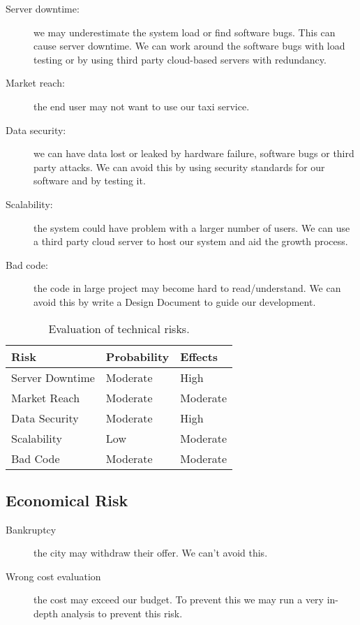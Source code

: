     \begin{description}
      \item[Server downtime:] we may underestimate the system load or find
          software bugs. This can cause server downtime. We can work around
          the software bugs with load testing or by using third party cloud-based servers with redundancy.
      \item[Market reach:] the end user may not want to use our taxi service. 
      \item[Data security:] we can have data lost or leaked by hardware failure,
          software bugs or third party attacks. We can avoid
          this by using security standards for our software and by testing it.
      \item[Scalability:] the system could have problem with a larger number of users. We can use a third party cloud server
          to host our system and aid the growth process.
      \item[Bad code:] the code in large project may become hard to read/understand. We can avoid this by
          write a Design Document to guide our development.
    \end{description}

    \begin{table}[h]
      \centering
          \begin{tabular}{| l | l | l |}
              \hline
              \textbf{Risk} & \textbf{Probability}  & \textbf{Effects}  \\
              \hline
              Server Downtime & Moderate & High\\
              \hline
              Market Reach & Moderate & Moderate\\
              \hline
              Data Security & Moderate & High\\
              \hline
              Scalability & Low & Moderate          \\
              \hline
              Bad Code & Moderate & Moderate\\
              \hline
          \end{tabular}
        \caption{Evaluation of technical risks.}
    \end{table}
	
  \subsection{Economical Risk}
    \begin{description}
      \item[Bankruptcy] the city may withdraw their offer. We can't avoid this.
      \item[Wrong cost evaluation] the cost may exceed our budget. To prevent this we may run a very in-depth analysis to prevent this risk.
    \end{description}

